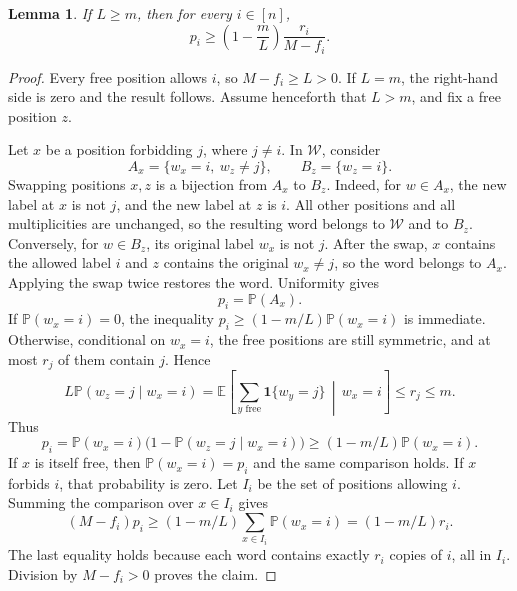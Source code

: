 \documentclass[10pt,a4paper]{amsart}
\newtheorem{lemma}[theorem]{Lemma}
\newcommand{\ind}{\mathbf 1}
\begin{document}
\begin{lemma}\label{low:lem:switch}
If $L\ge m$, then for every $i\in[n]$,
\[
 p_i\ge\left(1-\frac mL\right)\frac{r_i}{M-f_i}.
\]
\end{lemma}

\begin{proof}
Every free position allows $i$, so $M-f_i\ge L>0$. If $L=m$, the right-hand side is zero and the result follows. Assume henceforth that $L>m$, and fix a free position $z$.

Let $x$ be a position forbidding $j$, where $j\ne i$. In $\mathcal W$, consider
\[
 A_x=\{w_x=i,\ w_z\ne j\},\qquad B_z=\{w_z=i\}.
\]
Swapping positions $x,z$ is a bijection from $A_x$ to $B_z$. Indeed, for $w\in A_x$, the new label at $x$ is not $j$, and the new label at $z$ is $i$. All other positions and all multiplicities are unchanged, so the resulting word belongs to $\mathcal W$ and to $B_z$. Conversely, for $w\in B_z$, its original label $w_x$ is not $j$. After the swap, $x$ contains the allowed label $i$ and $z$ contains the original $w_x\ne j$, so the word belongs to $A_x$. Applying the swap twice restores the word. Uniformity gives
\[
 p_i=\mathbb P(A_x).
\]
If $\mathbb P(w_x=i)=0$, the inequality $p_i\ge(1-m/L)\mathbb P(w_x=i)$ is immediate. Otherwise, conditional on $w_x=i$, the free positions are still symmetric, and at most $r_j$ of them contain $j$. Hence
\[
 L\mathbb P(w_z=j\mid w_x=i)
 =\mathbb E\left[\sum_{y\text{ free}}\ind\{w_y=j\}\,\middle|\,w_x=i\right]
 \le r_j\le m.
\]
Thus
\[
 p_i=\mathbb P(w_x=i)
       \bigl(1-\mathbb P(w_z=j\mid w_x=i)\bigr)
 \ge(1-m/L)\mathbb P(w_x=i).
\]
If $x$ is itself free, then $\mathbb P(w_x=i)=p_i$ and the same comparison holds. If $x$ forbids $i$, that probability is zero. Let $I_i$ be the set of positions allowing $i$. Summing the comparison over $x\in I_i$ gives
\[
 (M-f_i)p_i
 \ge(1-m/L)\sum_{x\in I_i}\mathbb P(w_x=i)
 =(1-m/L)r_i.
\]
The last equality holds because each word contains exactly $r_i$ copies of $i$, all in $I_i$. Division by $M-f_i>0$ proves the claim.
\end{proof}
\end{document}

